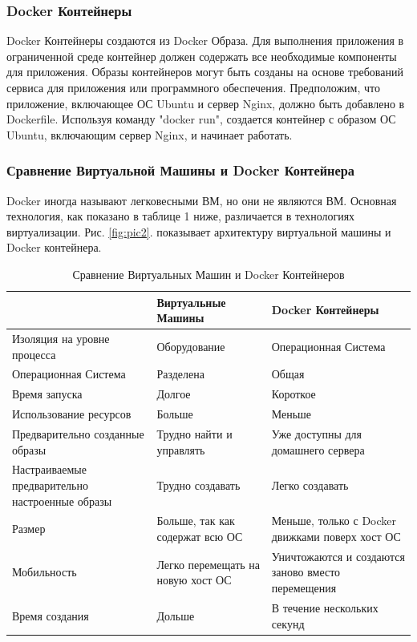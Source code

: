 \documentclass{mirea}
\begin{document}
	\subsubsection{Docker Контейнеры}
	
	Docker Контейнеры создаются из Docker Образа. Для выполнения приложения в ограниченной среде контейнер должен содержать все необходимые компоненты для приложения. Образы контейнеров могут быть созданы на основе требований сервиса для приложения или программного обеспечения. Предположим, что приложение, включающее ОС Ubuntu и сервер Nginx, должно быть добавлено в Dockerfile. Используя команду "docker run", создается контейнер с образом ОС Ubuntu, включающим сервер Nginx, и начинает работать.
	
	\subsubsection{Сравнение Виртуальной Машины и Docker Контейнера}
	
	Docker иногда называют легковесными ВМ, но они не являются ВМ. Основная технология, как показано в таблице 1 ниже, различается в технологиях виртуализации. Рис. \ref{fig:pic2}. показывает архитектуру виртуальной машины и Docker контейнера.
	
	\begin{table}[h]
		\centering
		\caption{Сравнение Виртуальных Машин и Docker Контейнеров}
		\begin{tabular}{@{}p{4cm}p{4cm}p{4cm}@{}}
			\toprule
			& Виртуальные Машины & Docker Контейнеры \\ \midrule
			Изоляция на уровне процесса & Оборудование & Операционная Система \\
			Операционная Система & Разделена & Общая \\
			Время запуска & Долгое & Короткое \\
			Использование ресурсов & Больше & Меньше \\
			Предварительно созданные образы & Трудно найти и управлять & Уже доступны для домашнего сервера \\
			Настраиваемые предварительно настроенные образы & Трудно создавать & Легко создавать \\
			Размер & Больше, так как содержат всю ОС & Меньше, только с Docker движками поверх хост ОС \\
			Мобильность & Легко перемещать на новую хост ОС & Уничтожаются и создаются заново вместо перемещения \\
			Время создания & Дольше & В течение нескольких секунд \\ 
			\bottomrule
		\end{tabular}
	\end{table}
\end{document}
